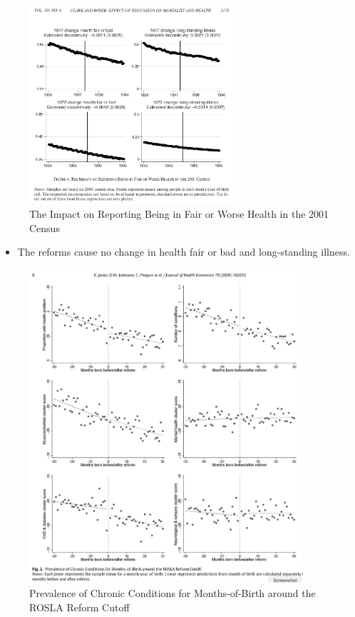 \begin{figure}[H]%
                \centering
                \includegraphics[width=3in]{images/ch3/38.png}
                \caption{The Impact on Reporting Being in Fair or Worse Health in the 2001 Census}
                \label{fig:label}
            \end{figure}  

\begin{itemize}
        \item The reforms cause no change in health fair or bad and long-standing illness.

\end{itemize}

\begin{figure}[H]%
                \centering
                \includegraphics[width=4in]{images/ch3/39.png}
                \caption{Prevalence of Chronic Conditions for Months-of-Birth around the ROSLA Reform Cutoff}
                \label{fig:label}
            \end{figure} 

